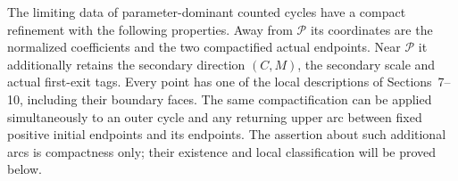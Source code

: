 \begin{lemma}\label{rw:fibre:candidate-space}
The limiting data of parameter-dominant counted cycles have a compact
refinement with the following properties.
Away from $\mathcal P$ its coordinates are the normalized
coefficients and the two compactified actual endpoints.
Near $\mathcal P$ it additionally retains the secondary direction
$(C,M)$, the secondary scale and actual first-exit tags.
Every point has one of the local descriptions of Sections~7--10,
including their boundary faces. The same compactification can be
applied simultaneously to an outer cycle and any returning upper
arc between fixed positive initial endpoints and its endpoints.
The assertion about such additional arcs is compactness only;
their existence and local classification will be proved below.
\end{lemma}
